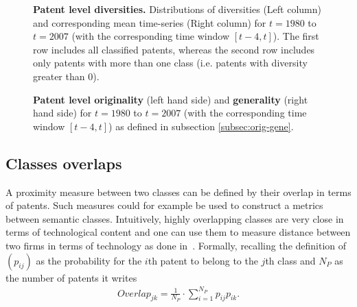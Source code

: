 \documentclass[10pt,A4,draft]{article}
\begin{document}
\begin{figure}
\caption{
\textbf{Patent level diversities.} Distributions of diversities (Left column) and corresponding mean time-series (Right column) for $t=1980$ to $t=2007$ (with the corresponding time window $[t-4,t]$). The first row includes all classified patents, whereas the second row includes only patents with more than one class (i.e. patents with diversity greater than 0).
}
\label{fig:patent-level-orig}
\end{figure}
\begin{figure}
\caption{\textbf{Patent level originality} (left hand side) and \textbf{generality} (right hand side)  for $t=1980$ to $t=2007$ (with the corresponding time window $[t-4,t]$) as defined in subsection \ref{subsec:orig-gene}. }
\label{fig:orig-gene}
\end{figure}

\subsection{Classes overlaps} \label{subsec:overlaps}

A proximity measure between two classes can be defined by their overlap in terms of patents. 
Such measures could for example be used to construct a metrics between semantic classes. Intuitively, highly overlapping classes are very close in terms of technological content and one can use them to measure distance between two firms in terms of technology as done in~\cite{Bloom2005distance}. Formally, recalling the definition of $\left(p_{ij}\right)$ as the probability for the $i$th patent to belong to the $j$th class and $N_P$ as the number of patents it writes 
\begin{eqnarray}
\label{overlap}
Overlap_{jk} = \frac{1}{N_P}\cdot \sum_{i=1}^{N_P} p_{ij} p_{ik}. 
\end{eqnarray}
\end{document}
